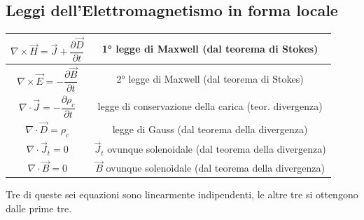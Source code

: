 \documentclass{article}
\begin{document}
\subsection{Leggi dell'Elettromagnetismo in forma locale}
\begin{center}
    \begin{tabular}{|c|c|}
        \hline
        $\nabla \times \vec H = \vec J + \dfrac{\partial
        \vec D}{\partial t}$ & 1° legge di Maxwell (dal teorema di Stokes) \\
        \hline 
        $\nabla \times \vec E = - \dfrac{\partial
        \vec B}{\partial t}$ & 2° legge di Maxwell
        (dal teorema di Stokes)\\
        \hline
        $\nabla \cdot \vec J = - \dfrac{\partial \rho_c}{\partial t} $ & legge di conservazione della carica (teor. divergenza)\\
        \hline
        $\nabla \cdot \vec D = \rho_c$ & legge di Gauss (dal teorema della divergenza)\\
        \hline
        $\nabla \cdot \vec J_t = 0$ & $\vec J_t$ ovunque solenoidale (dal teorema della divergenza)\\
        \hline 
        $\nabla \cdot \vec B =0$ & $\vec B$ ovunque solenoidale (dal teorema della divergenza)\\
        \hline
    \end{tabular}    
\end{center}
Tre di queste sei equazioni sono linearmente indipendenti, le altre tre si ottengono dalle prime tre.
\end{document}
